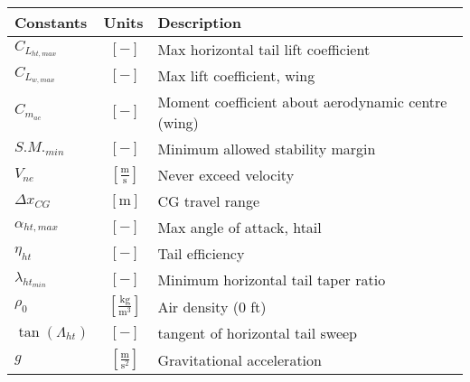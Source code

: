 \documentclass[12pt]{article}
\begin{document}
{\footnotesize
\begin{supertabular}{lcl}
\toprule
Constants & Units & Description \\ \midrule
$C_{L_{ht,max}}$ & $~[-]$ & Max horizontal tail lift coefficient \\
$C_{L_{w,max}}$ & $~[-]$ & Max lift coefficient, wing \\
$C_{m_{ac}}$ & $~[-]$ & Moment coefficient about aerodynamic centre (wing) \\
$S.M._{min}$ & $~[-]$ & Minimum allowed stability margin\\
$V_{ne}$ & $~\mathrm{[\tfrac{m}{s}]}$ & Never exceed velocity \\
$\Delta x_{CG}$ & $~\mathrm{[m]}$ & CG travel range\\
$\alpha_{ht,max}$ & $~[-]$ & Max angle of attack, htail \\
$\eta_{ht}$ & $~[-]$ & Tail efficiency \\
$\lambda_{ht_{min}} $ & $~[-]$ & Minimum horizontal tail taper ratio \\
$\rho_0$ & $~\mathrm{[\tfrac{kg}{m^{3}}]}$ & Air density (0 ft) \\
$\tan(\Lambda_{ht})$ & $~[-]$ & tangent of horizontal tail sweep \\
$g$ & $~\mathrm{[\tfrac{m}{s^{2}}]}$ & Gravitational acceleration \\
\bottomrule
\end{supertabular}}

 
\end{document}

